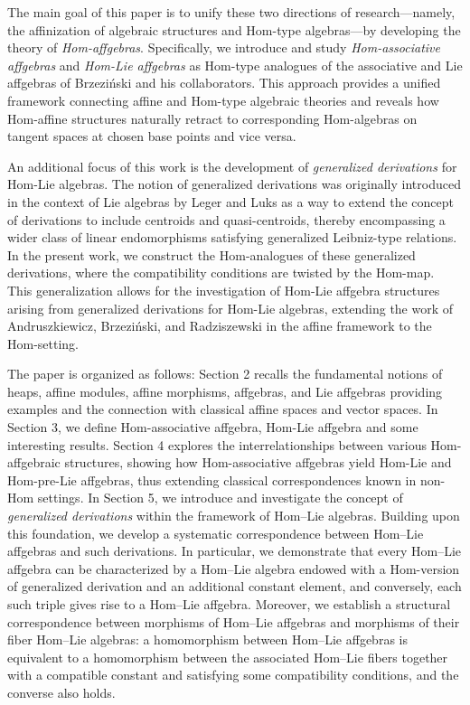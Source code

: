 \documentclass[14pt]{article}
\theoremstyle{Definition}
\theoremstyle{remark}
\begin{document}
The main goal of this paper is to unify these two directions of research—namely, the affinization of algebraic structures and Hom-type algebras—by developing the theory of \emph{Hom-affgebras}. Specifically, we introduce and study \emph{Hom-associative affgebras} and \emph{Hom-Lie affgebras} as Hom-type analogues of the associative and Lie affgebras of Brzezi\'nski and his collaborators. This approach provides a unified framework connecting affine and Hom-type algebraic theories and reveals how Hom-affine structures naturally retract to corresponding Hom-algebras on tangent spaces at chosen base points and vice versa.

An additional focus of this work is the development of \emph{generalized derivations} for Hom-Lie algebras. The notion of generalized derivations was originally introduced in the context of Lie algebras by Leger and Luks \cite{Leg1} as a way to extend the concept of derivations to include centroids and quasi-centroids, thereby encompassing a wider class of linear endomorphisms satisfying generalized Leibniz-type relations. In the present work, we construct the Hom-analogues of these generalized derivations, where the compatibility conditions are twisted by the Hom-map. This generalization allows for the investigation of Hom-Lie affgebra structures arising from generalized derivations for Hom-Lie algebras, extending the work of Andruszkiewicz, Brzezi\'nski, and Radziszewski in the affine framework \cite{And2} to the Hom-setting. 

The paper is organized as follows: Section 2 recalls the fundamental notions of heaps, affine modules, affine morphisms, affgebras, and Lie affgebras providing examples and the connection with classical affine spaces and vector spaces. In Section 3, we define Hom-associative affgebra, Hom-Lie affgebra and some interesting results. Section 4 explores the interrelationships between various Hom-affgebraic structures, showing how Hom-associative affgebras yield Hom-Lie and Hom-pre-Lie affgebras, thus extending classical correspondences known in non-Hom settings. In Section 5, we introduce and investigate the concept of \emph{generalized derivations} within the framework of Hom--Lie algebras. Building upon this foundation, we develop a systematic correspondence between Hom--Lie affgebras and such derivations. In particular, we demonstrate that every Hom--Lie affgebra can be characterized by a Hom--Lie algebra endowed with a Hom-version of generalized derivation and an additional constant element, and conversely, each such triple gives rise to a Hom--Lie affgebra. Moreover, we establish a structural correspondence between morphisms of Hom--Lie affgebras and morphisms of their fiber Hom--Lie algebras: a homomorphism between Hom--Lie affgebras is equivalent to a homomorphism between the associated Hom--Lie fibers together with a compatible constant and satisfying some compatibility conditions, and the converse also holds.
\end{document}
